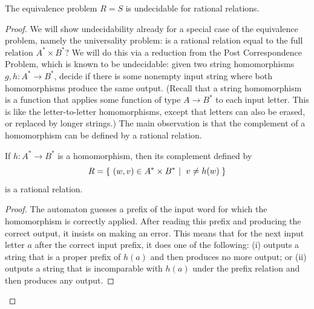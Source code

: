 \begin{theorem}[Griffiths]\label{thm:undecidable-equivalence-rational-relations}
    The equivalence problem $R=S$ is undecidable for rational relations.
\end{theorem}
\begin{proof}
    We will show undecidability already for a special case of the equivalence problem, namely the universality problem: is a rational relation equal to the full relation $A^* \times B^*$?  We will do this via a reduction from the Post Correspondence Problem, which is known to be undecidable: given two string homomorphisms $g,h : A^* \to B^*$, decide if there is some nonempty input string where both homomorphisms produce the same output. (Recall that a string homomorphism is a function that applies some function of type $A \to B^*$ to each input letter. This is like the letter-to-letter homomorphisms, except that letters can also be erased, or replaced by longer strings.)    The main observation is that the complement of a homomorphism can be defined by a rational relation. 

    \begin{claim}\label{claim:homomorphism-complement-rational}
        If $h : A^* \to B^*$ is a homomorphism, then its complement defined by
        \begin{align*}
        R = \setbuild{ (w,v) \in A^* \times B^*}{$v \neq h(w)$}
        \end{align*} 
        is a rational relation.
    \end{claim}
    \begin{proof}
        The automaton guesses a prefix of the input word for which the homomorphism is correctly applied. After reading this prefix and producing the correct output, it insists on making an error. This means that for the next input letter $a$ after the correct input prefix, it does one of the following: (i) outputs a string that is a proper prefix of $h(a)$ and then produces no more output; or (ii) outputs a string that is  incomparable with $h(a)$ under the prefix relation and then produces any output.
    \end{proof}


\end{proof}
